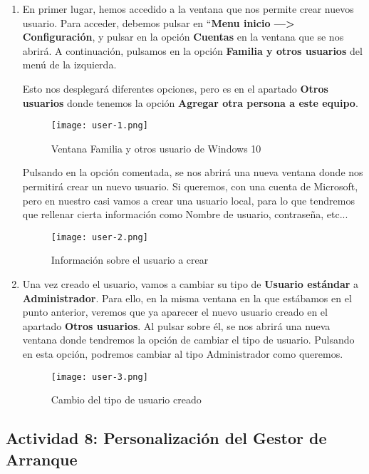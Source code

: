 \begin{enumerate}
    \item En primer lugar, hemos accedido a la ventana que nos permite crear nuevos usuario. Para acceder, debemos pulsar en ``\textbf{Menu inicio ---> Configuración}, y pulsar en la opción \textbf{Cuentas} en la ventana que se nos abrirá. A continuación, pulsamos en la opción \textbf{Familia y otros usuarios} del menú de la izquierda.

    Esto nos desplegará diferentes opciones, pero es en el apartado \textbf{Otros usuarios} donde tenemos la opción \textbf{Agregar otra persona a este equipo}.

    \begin{figure}[H]
        \centering
        \texttt{[image: user-1.png]}
        \caption{Ventana Familia y otros usuario de Windows 10}
    \end{figure}

    Pulsando en la opción comentada, se nos abrirá una nueva ventana donde nos permitirá crear un nuevo usuario. Si queremos, con una cuenta de Microsoft, pero en nuestro casi vamos a crear una usuario local, para lo que tendremos que rellenar cierta información como Nombre de usuario, contraseña, etc...

    \begin{figure}[H]
        \centering
        \texttt{[image: user-2.png]}
        \caption{Información sobre el usuario a crear}
    \end{figure}

    \item Una vez creado el usuario, vamos a cambiar su tipo de \textbf{Usuario estándar} a \textbf{Administrador}. Para ello, en la misma ventana en la que estábamos en el punto anterior, veremos que ya aparecer el nuevo usuario creado en el apartado \textbf{Otros usuarios}. Al pulsar sobre él, se nos abrirá una nueva ventana donde tendremos la opción de cambiar el tipo de usuario. Pulsando en esta opción, podremos cambiar al tipo Administrador como queremos.

    \begin{figure}[H]
        \centering
        \texttt{[image: user-3.png]}
        \caption{Cambio del tipo de usuario creado}
    \end{figure}
\end{enumerate}

\subsection{Actividad 8: Personalización del Gestor de Arranque}

